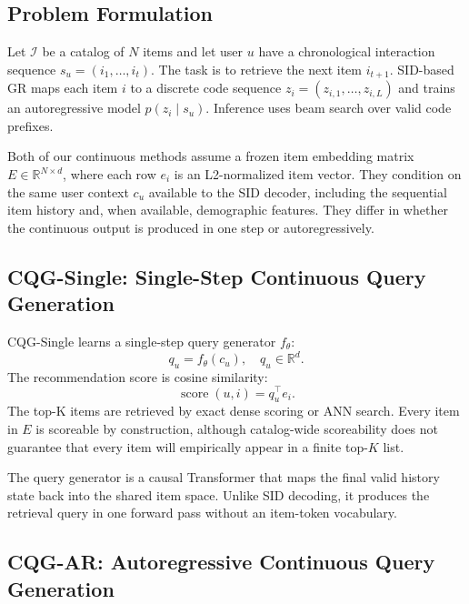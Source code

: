 \documentclass[letterpaper]{article}
\begin{document}
\subsection{Problem Formulation}

Let $\mathcal{I}$ be a catalog of $N$ items and let user $u$ have a chronological interaction sequence $s_u=(i_1,\ldots,i_t)$. The task is to retrieve the next item $i_{t+1}$. SID-based GR maps each item $i$ to a discrete code sequence $z_i=(z_{i,1},\ldots,z_{i,L})$ and trains an autoregressive model $p(z_i\mid s_u)$. Inference uses beam search over valid code prefixes.

Both of our continuous methods assume a frozen item embedding matrix $E\in\mathbb{R}^{N\times d}$, where each row $e_i$ is an L2-normalized item vector. They condition on the same user context $c_u$ available to the SID decoder, including the sequential item history and, when available, demographic features. They differ in whether the continuous output is produced in one step or autoregressively.

\subsection{CQG-Single: Single-Step Continuous Query Generation}

CQG-Single learns a single-step query generator $f_\theta$:
\begin{equation}
q_u = f_\theta(c_u), \quad q_u\in\mathbb{R}^d .
\end{equation}
The recommendation score is cosine similarity:
\begin{equation}
\operatorname{score}(u,i)=q_u^\top e_i .
\end{equation}
The top-K items are retrieved by exact dense scoring or ANN search. Every item in $E$ is scoreable by construction, although catalog-wide scoreability does not guarantee that every item will empirically appear in a finite top-$K$ list.

The query generator is a causal Transformer that maps the final valid history
state back into the shared item space. Unlike SID decoding, it produces the
retrieval query in one forward pass without an item-token vocabulary.

\subsection{CQG-AR: Autoregressive Continuous Query Generation}
\end{document}

